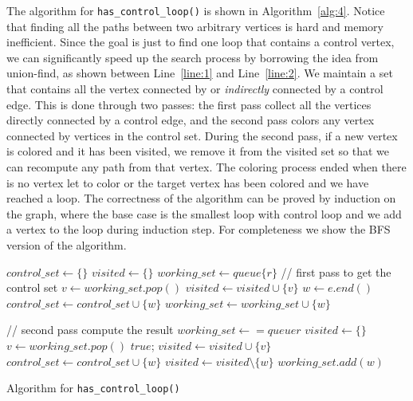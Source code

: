 \documentclass{article}
\begin{document}
The algorithm for \texttt{has\_control\_loop()} is shown in Algorithm~\ref{alg:4}. Notice that
finding all the paths between two arbitrary vertices is hard and memory inefficient. Since the
goal is just to find one loop that contains a control vertex, we can significantly speed up
the search process by borrowing the idea from union-find, as shown between Line~\ref{line:1} and
Line~\ref{line:2}. We maintain a set that contains all the vertex connected by or \textit{indirectly}
connected by a control edge. This is done through two passes: the first pass collect all the
vertices directly connected by a control edge, and the second pass colors any vertex connected by
vertices in the control set. During the second pass, if a new vertex is colored and it has been
visited, we remove it from the visited set so that we can recompute any path from that vertex.
The coloring process ended when there is no vertex let to color or the target vertex has been
colored and we have reached a loop. The correctness of the algorithm can be proved by induction
on the graph, where the base case is the smallest loop with control loop and we add a vertex to
the loop during induction step. For completeness we show the BFS version of the algorithm.
\begin{algorithm}
    \label{alg:4}
    $control\_set \gets \{\}$\;
    $visited \gets \{\}$\;
    $working\_set \gets queue\{r\}$\;
    // first pass to get the control set\;
     {
        $v \gets working\_set.pop()$\;
         {
            \Continue\;
        } {
            $visited \gets visited \cup \{v\}$\;
        }
         {
            $w \gets e.end()$\;
             {
                $control\_set \gets control\_set \cup \{w\}$\;
            }
            $working\_set \gets working\_set \cup \{w\}$\;
        }
    }

    // second pass compute the result\;
    $working\_set \gets = queue{r}$\;
    $visited \gets \{\}$\;
     {
        $v \gets working\_set.pop()$\;
         {
            \Return $true$;
        }
         {
            \Continue\;
        } {
            $visited \gets visited \cup \{v\}$\;
        }
         {
            \label{line:1} {
                $control\_set \gets control\_set \cup \{w\}$\;
                 {
                    $visited \gets visited \setminus \{w\}$\;
                }
            \label{line:2}}
            $working\_set.add(w)$\;
        }
    }
    \;
 \caption{Algorithm for \texttt{has\_control\_loop()}}
\end{algorithm}
\end{document}

